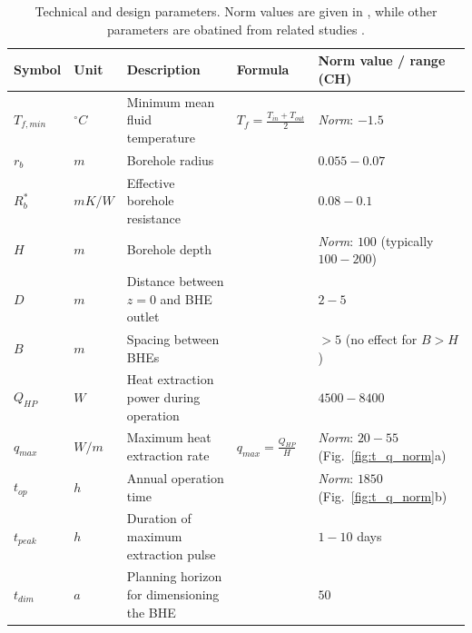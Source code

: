 \begin{table}[t]
\footnotesize
\caption{Technical and design parameters. Norm values are given in \citep{sia_sondes_2010}, while other parameters are obatined from related studies \citep{pahud_geothermal_2002, wagner_erdwarmesonden._2019, claesson_conductive_1988}.}
\centering
\begin{tabular}{lllll}
\hline
\textbf{Symbol} & \textbf{Unit} & \textbf{Description}                   & \textbf{Formula}                                        & \textbf{Norm value / range (CH)} \\ \hline
$T_{f, min}$    & $^\circ C$    & Minimum mean fluid temperature         & $T_{f} = \frac{T_{in} + T_{out}}{2}$                    & \textit{Norm}: $- 1.5$           \\
$r_b$           & $m$           & Borehole radius                        &                                                         & $0.055-0.07$                      \\
$R_b^*$         & $mK/W$        & Effective borehole resistance          &                                                         & $0.08-0.1$                       \\ \hline
$H$             & $m$           & Borehole depth                         &                                                         & \textit{Norm}: $100$ (typically $100-200$)          \\
$D$             & $m$           & Distance between $z=0$ and BHE outlet  &                                                         & $2-5$                              \\
$B$             & $m$           & Spacing between BHEs                   &                                                         & $>5$ (no effect for $B > H$)     \\ \hline
$Q_{HP}$        & $W$           & Heat extraction power during operation &                                                         & $4500-8400$                      \\
$q_{max}$       & $W/m$         & Maximum heat extraction rate           & $q_{max} = \frac{Q_{HP}}{H}$                            & \textit{Norm}: $20-55$ (Fig.~\ref{fig:t_q_norm}a)           \\
$t_{op}$        & $h$           & Annual operation time                  &                                                         & \textit{Norm}: $1850$ (Fig.~\ref{fig:t_q_norm}b)  \\
$t_{peak}$      & $h$           & Duration of maximum extraction pulse   &                                                         & $1 - 10$ days                    \\ 
\hline
$t_{dim}$       & $a$           & Planning horizon for dimensioning the BHE   &                                                         & $50$                    \\ 
\hline
\end{tabular}
\label{tab:tech_design_params}
\end{table}

